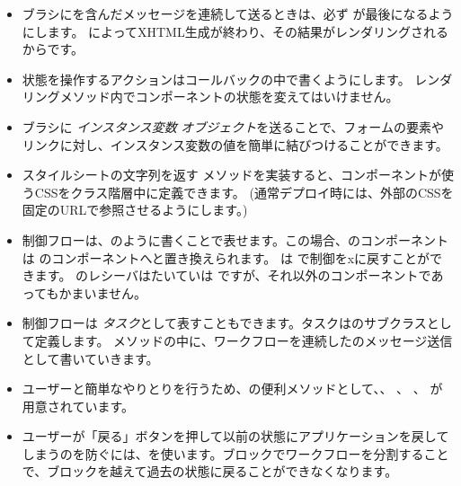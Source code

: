 \documentclass[a4paper,10pt,twoside]{book}
\begin{document}
\begin{itemize}
  \item ブラシにを含んだメッセージを連続して送るときは、必ず が最後になるようにします。
    によってXHTML生成が終わり、その結果がレンダリングされるからです。
  \item 状態を操作するアクションはコールバックの中で書くようにします。
レンダリングメソッド内でコンポーネントの状態を変えてはいけません。
  \item ブラシに \emph{インスタンス変数}  \emph{オブジェクト}を送ることで、フォームの要素やリンクに対し、インスタンス変数の値を簡単に結びつけることができます。
  \item スタイルシートの文字列を返す メソッドを実装すると、コンポーネントが使うCSSをクラス階層中に定義できます。
    (通常デプロイ時には、外部のCSSを固定のURLで参照させるようにします。)
  \item 制御フローは、のように書くことで表せます。この場合、のコンポーネントは のコンポーネントへと置き換えられます。  は  で制御をxに戻すことができます。
    のレシーバはたいていは ですが、それ以外のコンポーネントであってもかまいません。
  \item 制御フローは \emph{タスク}として表すこともできます。タスクはのサブクラスとして定義します。 メソッドの中に、ワークフローを連続したのメッセージ送信として書いていきます。
  \item ユーザーと簡単なやりとりを行うため、の便利メソッドとして、、 、 、 が用意されています。
  \item ユーザーが「戻る」ボタンを押して以前の状態にアプリケーションを戻してしまうのを防ぐには、を使います。ブロックでワークフローを分割することで、ブロックを越えて過去の状態に戻ることができなくなります。
\end{itemize}

\ifx\wholebook\relax\else 
   
   
\end{document}
